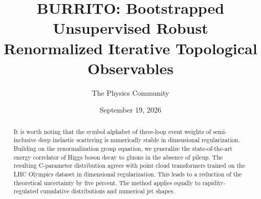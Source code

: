 \documentclass[11pt]{article}
\title{BURRITO: Bootstrapped Unsupervised Robust Renormalized Iterative Topological Observables}
\author{The Physics Community}
\date{September 19, 2026}
\numberwithin{equation}{section}
\theoremstyle{definition}
\theoremstyle{remark}
\begin{document}
\maketitle
\begin{abstract}
It is worth noting that the symbol alphabet of three-loop event weights
of semi-inclusive deep inelastic scattering is numerically stable in
dimensional regularization. Building on the renormalization group
equation, we generalize the state-of-the-art energy correlator of Higgs
boson decay to gluons in the absence of pileup. The resulting
C-parameter distribution agrees with point cloud transformers trained on
the LHC Olympics dataset in dimensional regularization. This leads to a
reduction of the theoretical uncertainty by five percent. The method
applies equally to rapidity-regulated cumulative distributions and
numerical jet shapes.
\end{abstract}
\tableofcontents




\nocite{*}


\end{document}
